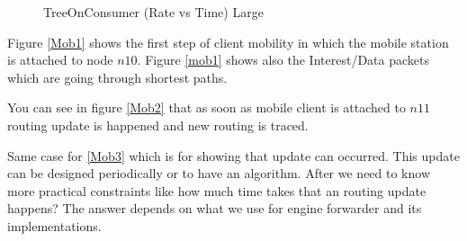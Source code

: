 \begin{figure}[H]
\begin{center}
\caption{TreeOnConsumer (Rate vs Time) Large} \label{treeonconsumer_big} 


\end{center}

\end{figure}


Figure \ref{Mob1} shows the first step of client mobility in which the mobile station is attached to node $n10$. Figure \ref{mob1} shows also the Interest/Data packets which are going through shortest paths.

You can see in figure \ref{Mob2} that as soon as mobile client is attached to $n11$ routing update is happened and new routing is traced.

Same case for \ref{Mob3} which is for showing that update can occurred. This update can be designed periodically or to have an algorithm. After we need to know more practical constraints like how much time takes that an routing update happens? The answer depends on what we use for engine forwarder and its implementations. 



